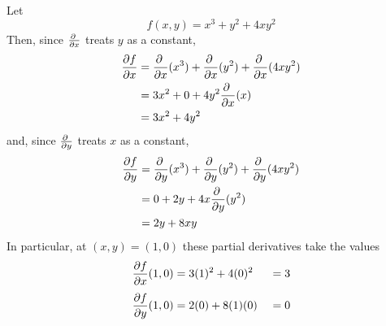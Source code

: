 \begin{eg}\label{eg partials A}
Let
\begin{equation*}
f(x,y) = x^3+y^2+ 4xy^2 
\end{equation*}
Then, since $\pdiff{}{x}$ treats $y$ as a constant,
\begin{align*}
\pdiff{f}{x}%
&= \pdiff{}{x}(x^3) + \pdiff{}{x}(y^2) +\pdiff{}{x}(4xy^2) \\
&= 3x^2+0 + 4y^2\pdiff{}{x}(x) \\
&= 3x^2 +4y^2 
\end{align*}
and, since $\pdiff{}{y}$ treats $x$ as a constant,
\begin{align*}
\pdiff{f}{y}%
&= \pdiff{}{y}(x^3) + \pdiff{}{y}(y^2) +\pdiff{}{y}(4xy^2) \\
&= 0 + 2y + 4x\pdiff{}{y}(y^2) \\
&= 2y+8xy
\end{align*}
In particular, at $(x,y)=(1,0)$ these partial derivatives take the values 
\begin{alignat*}{3}
\pdiff{f}{x}(1,0) &= 3(1)^2 +4(0)^2&=3 \\[0.05in]
\pdiff{f}{y}(1,0) &= 2(0) +8(1)(0)\ &=0 
\end{alignat*}
\end{eg}\goodbreak

